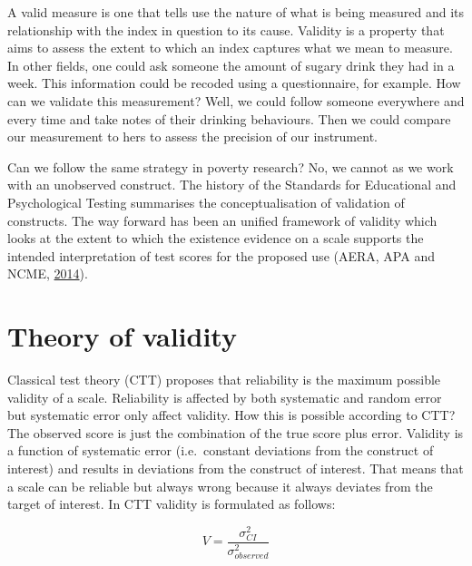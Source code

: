 \documentclass[]{book}
\begin{document}
A valid measure is one that tells use the nature of what is being measured and its relationship with the index in question to its cause. Validity is a property that aims to assess the extent to which an index captures what we mean to measure. In other fields, one could ask someone the amount of sugary drink they had in a week. This information could be recoded using a questionnaire, for example. How can we validate this measurement? Well, we could follow someone everywhere and every time and take notes of their drinking behaviours. Then we could compare our measurement to hers to assess the precision of our instrument.

Can we follow the same strategy in poverty research? No, we cannot as we work with an unobserved construct. The history of the Standards for Educational and Psychological Testing summarises the conceptualisation of validation of constructs. The way forward has been an unified framework of validity which looks at the extent to which the existence evidence on a scale supports the intended interpretation of test scores for the proposed use (AERA, APA and NCME, \protect\hyperlink{ref-AERA2014}{2014}).

\hypertarget{theory-of-validity}{%
\section{Theory of validity}\label{theory-of-validity}}

Classical test theory (CTT) proposes that reliability is the maximum possible validity of a scale. Reliability is affected by both systematic and random error but systematic error only affect validity. How this is possible according to CTT? The observed score is just the combination of the true score plus error. Validity is a function of systematic error (i.e.~constant deviations from the construct of interest) and results in deviations from the construct of interest. That means that a scale can be reliable but always wrong because it always deviates from the target of interest. In CTT validity is formulated as follows:

\begin{equation}
\label{eq:validity1}
V = \frac{\sigma^2_{CI}} {\sigma^2_{observed}}
\end{equation}
\end{document}
